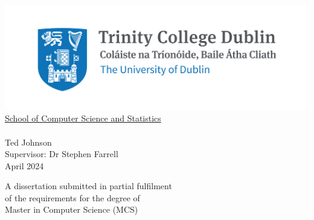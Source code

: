 \hypersetup{pageanchor=false}

\begin{titlepage}

\center

\includegraphics{images/trinity_college_dublin.png}\\[1cm]
\Large \href{https://www.tcd.ie/scss/}{School of Computer Science and Statistics}\\[1.5cm]
\\[1.5cm]
Ted Johnson\\[2cm]
Supervisor: Dr Stephen Farrell\\[2cm]
{\large April 2024}\\[2cm]

\vfill

A dissertation submitted in partial fulfilment\\
of the requirements for the degree of\\
Master in Computer Science (MCS)

\vfill

\end{titlepage}

\hypersetup{pageanchor=true}
